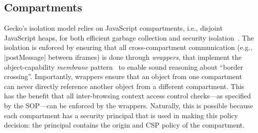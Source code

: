 \subsection{Compartments}
\begin{table}
\caption{Confining code from exfiltrating data using existing browser
mechanisms.}
\label{tab:comm}
\end{table}
 
Gecko's isolation model relies on JavaScript compartments, i.e.,
disjoint JavaScript heaps, for both efficient garbage collection and
security isolation~\cite{wagner2011compartmental}.
%
The isolation is enforced by ensuring that all cross-compartment
communication (e.g., \js|postMessage| between iframes) is done through
\emph{wrappers}, that implement the object-capability \emph{membrane}
pattern~\cite{miller2003paradigm,miller2006robust} to enable sound reasoning
about ``border crossing''. 
%
Importantly, wrappers ensure that an object from one compartment can
never directly reference another object from a different compartment.
%
This has the benefit that all inter-browsing context access control
checks---as specified by the SOP---can be enforced by the wrappers.
%
Naturally, this is possible because each compartment has a security
principal that is used in making this policy decision:
the principal contains the origin and CSP policy of the compartment.

